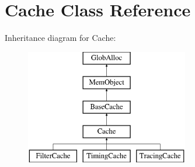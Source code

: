 \hypertarget{classCache}{\section{Cache Class Reference}
\label{classCache}
}
Inheritance diagram for Cache\-:\begin{figure}[H]
\begin{center}
\leavevmode
\includegraphics[height=5.000000cm]{classCache}
\end{center}
\end{figure}
